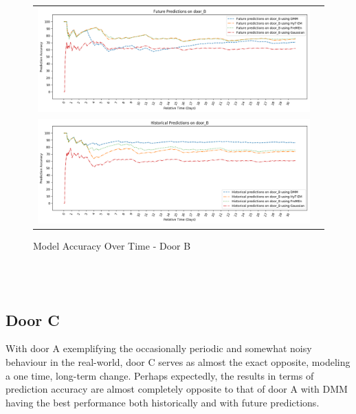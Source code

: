 \begin{center}
\begin{figure}[!Hp]
  \begin{tabular}{cc}
    {\includegraphics[width = 6in]{images/results/Future_Predictions_on_door_B.png}} \\
    {\includegraphics[width = 6in]{images/results/Historical_Predictions_on_door_B.png}} \\
  \end{tabular}
  \caption{Model Accuracy Over Time - Door B}
  \label{figure:accuracy_door_B}
\end{figure}\\ \\
\end{center}


\subsection { Door C }

With door A exemplifying the occasionally periodic and somewhat noisy
behaviour in the real-world, door C serves as almost the exact opposite,
modeling a one time, long-term change.
Perhaps expectedly, the results in terms of prediction accuracy are
almost completely opposite to that of door A with DMM having the best
performance both historically and with future predictions. \\

